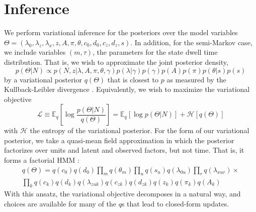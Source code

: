 \documentclass{article} %
\begin{document}
\section{Inference}
We perform variational inference for the posteriors over the model variables $\Theta = (\lambda_0, \lambda_z, \lambda_x, z, A, \pi, \theta, c_0, d_0, c_z, d_z, s)$. In addition, for the semi-Markov case, we include variables $(m, \tau)$, the parameters for the state dwell time distribution. That is, we wish to approximate the joint posterior density, 
\begin{equation}
    p(\Theta|N) \propto p(N, z|\lambda, A, \pi, \theta, \gamma) 
    p(\lambda|\gamma) p(\gamma)
    p(A)p(\pi)p(\theta|s)p(s)
\end{equation}
by a variational posterior $q(\Theta)$ that is closest to $p$ as measured by the Kullback-Leibler divergence \cite{Wainwright2008-ii}. Equivalently, we wish to maximize the variational objective
\begin{equation}
    \mathcal{L} \equiv \mathbb{E}_q \left[\log \frac{p(\Theta|N)}{q(\Theta)} \right] = \mathbb{E}_q \left[\log p(\Theta|N) \right] + \mathcal{H}[q(\Theta)]
\end{equation}
with $\mathcal{H}$ the entropy of the variational posterior. For the form of our variational posterior, we take a quasi-mean field approximation in which the posterior factorizes over units and latent and observed factors, but not time. That is, it forms a factorial HMM \cite{ghahramani1997factorial}:
\begin{multline}
    q(\Theta) = q(c_0)q(d_0)\prod_m q(\theta_m) \prod_u q(s_u) q(\lambda_{0u}) \prod_r q(\lambda_{xur}) \times \\ 
    \prod_k q(c_k) q(d_k) 
    q(\lambda_{zuk}) q(c_{zk}) q(d_{zk}) q(z_k) q(\pi_k) q(A_k)
\end{multline}
With this ansatz, the variational objective decomposes in a natural way, and choices are available for many of the $q$s that lead to closed-form updates.
\end{document}
